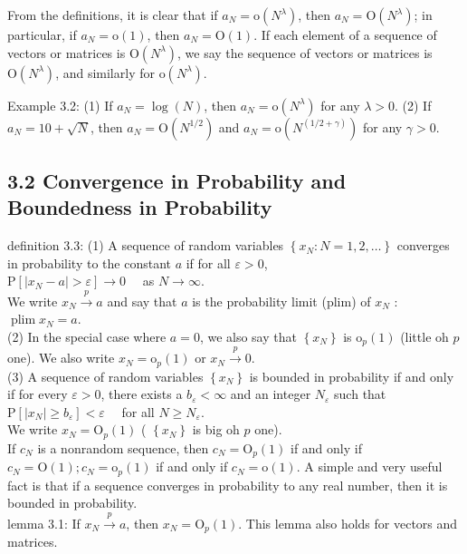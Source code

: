 \documentclass[10pt]{article}
\begin{document}
From the definitions, it is clear that if $a_{N}=\mathrm{o}\left(N^{\lambda}\right)$, then $a_{N}=\mathrm{O}\left(N^{\lambda}\right)$; in particular, if $a_{N}=\mathrm{o}(1)$, then $a_{N}=\mathrm{O}(1)$. If each element of a sequence of vectors or matrices is $\mathrm{O}\left(N^{\lambda}\right)$, we say the sequence of vectors or matrices is $\mathrm{O}\left(N^{\lambda}\right)$, and similarly for $\mathrm{o}\left(N^{\lambda}\right)$.

Example 3.2: (1) If $a_{N}=\log (N)$, then $a_{N}=\mathrm{o}\left(N^{\lambda}\right)$ for any $\lambda>0$. (2) If $a_{N}= 10+\sqrt{N}$, then $a_{N}=\mathrm{O}\left(N^{1 / 2}\right)$ and $a_{N}=\mathrm{o}\left(N^{(1 / 2+\gamma)}\right)$ for any $\gamma>0$.

\subsection*{3.2 Convergence in Probability and Boundedness in Probability}
definition 3.3: (1) A sequence of random variables $\left\{x_{N}: N=1,2, \ldots\right\}$ converges in probability to the constant $a$ if for all $\varepsilon>0$,\\
$\mathrm{P}\left[\left|x_{N}-a\right|>\varepsilon\right] \rightarrow 0 \quad$ as $N \rightarrow \infty$.\\
We write $x_{N} \xrightarrow{p} a$ and say that $a$ is the probability limit (plim) of $x_{N}$ : $\operatorname{plim} x_{N}=a$.\\
(2) In the special case where $a=0$, we also say that $\left\{x_{N}\right\}$ is $\mathrm{o}_{p}(1)$ (little oh $p$ one). We also write $x_{N}=\mathrm{o}_{p}(1)$ or $x_{N} \xrightarrow{p} 0$.\\
(3) A sequence of random variables $\left\{x_{N}\right\}$ is bounded in probability if and only if for every $\varepsilon>0$, there exists a $b_{\varepsilon}<\infty$ and an integer $N_{\varepsilon}$ such that\\
$\mathrm{P}\left[\left|x_{N}\right| \geq b_{\varepsilon}\right]<\varepsilon \quad$ for all $N \geq N_{\varepsilon}$.\\
We write $x_{N}=\mathrm{O}_{p}(1)$ ( $\left\{x_{N}\right\}$ is big oh $p$ one).\\
If $c_{N}$ is a nonrandom sequence, then $c_{N}=\mathrm{O}_{p}(1)$ if and only if $c_{N}=\mathrm{O}(1) ; c_{N}=\mathrm{o}_{p}(1)$ if and only if $c_{N}=\mathrm{o}(1)$. A simple and very useful fact is that if a sequence converges in probability to any real number, then it is bounded in probability.\\
lemma 3.1: If $x_{N} \xrightarrow{p} a$, then $x_{N}=\mathrm{O}_{p}(1)$. This lemma also holds for vectors and matrices.
\end{document}
